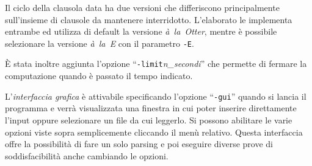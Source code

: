 \documentclass[a4paper,11pt]{article} %
\newcommand{\sintassi}{\texttt}
\begin{document}
Il ciclo della clausola data ha due versioni che differiscono principalmente
sull'insieme di clausole da mantenere interridotto. L'elaborato le implementa
entrambe ed utilizza di default la versione \emph{à~la~Otter}, mentre è possibile
selezionare la versione \emph{à~la~E} con il parametro \sintassi{-E}.

\`E stata inoltre aggiunta l'opzione ``\sintassi{-limit}\emph{n\_secondi}'' che permette 
di fermare la computazione quando è passato il tempo indicato.


L'\emph{interfaccia grafica}
è attivabile specificando l'opzione ``\sintassi{-gui}'' quando si
lancia il programma e verrà visualizzata una finestra in cui poter inserire
direttamente l'input oppure selezionare un file da cui leggerlo. %
Si possono abilitare le varie opzioni viste sopra semplicemente cliccando
il menù relativo.
Questa interfaccia offre la possibilità di fare un solo parsing
e poi eseguire diverse prove di soddisfacibilità anche cambiando le opzioni.
\end{document}
